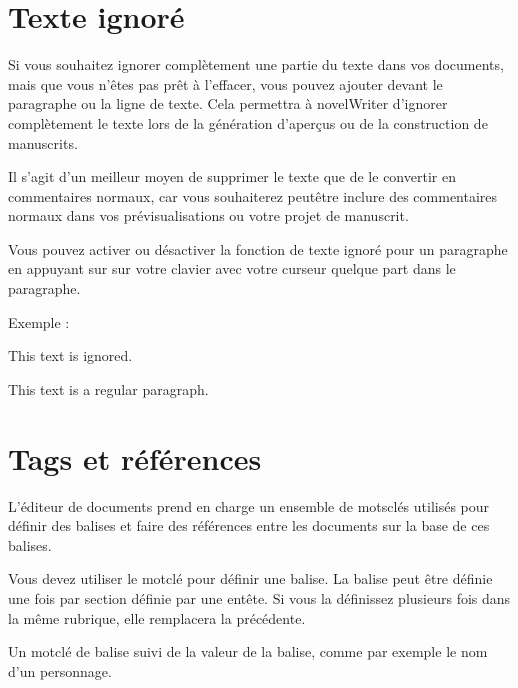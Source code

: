 \documentclass[a4paper,11pt,french]{sphinxmanual}
\begin{document}
\section{Texte ignoré}
\label{\detokenize{usage_format:ignored-text}}\label{\detokenize{usage_format:a-fmt-ignore}}
\sphinxAtStartPar
Si vous souhaitez ignorer complètement une partie du texte dans vos documents, mais que vous n’êtes pas prêt à l’effacer, vous pouvez ajouter \sphinxcode{\sphinxupquote{\%\textasciitilde{}}} devant le paragraphe ou la ligne de texte. Cela permettra à novelWriter d’ignorer complètement le texte lors de la génération d’aperçus ou de la construction de manuscrits.

\sphinxAtStartPar
Il s’agit d’un meilleur moyen de supprimer le texte que de le convertir en commentaires normaux, car vous souhaiterez peut\sphinxhyphen{}être inclure des commentaires normaux dans vos prévisualisations ou votre projet de manuscrit.

\sphinxAtStartPar
Vous pouvez activer ou désactiver la fonction de texte ignoré pour un paragraphe en appuyant sur  sur votre clavier avec votre curseur quelque part dans le paragraphe.

\sphinxAtStartPar
Exemple :

\begin{sphinxVerbatim}[commandchars=\\\{\}]
\PYGZpc{}\PYGZti{} This text is ignored.

This text is a regular paragraph.
\end{sphinxVerbatim}


\section{Tags et références}
\label{\detokenize{usage_format:tags-and-references}}\label{\detokenize{usage_format:a-fmt-tags}}
\sphinxAtStartPar
L’éditeur de documents prend en charge un ensemble de mots\sphinxhyphen{}clés utilisés pour définir des balises et faire des références entre les documents sur la base de ces balises.

\sphinxAtStartPar
Vous devez utiliser le mot\sphinxhyphen{}clé  pour définir une balise. La balise peut être définie une fois par section définie par une en\sphinxhyphen{}tête. Si vous la définissez plusieurs fois dans la même rubrique, elle remplacera la précédente.
\begin{description}
\sphinxAtStartPar
Un mot\sphinxhyphen{}clé de balise suivi de la valeur de la balise, comme par exemple le nom d’un personnage.

\end{description}
\end{document}
